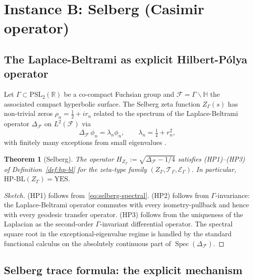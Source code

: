 \documentclass[11pt]{article}
\newtheorem{theorem}{Theorem}[section]
\theoremstyle{definition}
\theoremstyle{remark}
\newcommand{\HBL}{\mathrm{HP\text{-}BL}}
\newcommand{\PSL}{\mathrm{PSL}}
\newcommand{\Spec}{\operatorname{Spec}}
\newcommand{\halfline}{\tfrac{1}{2}}
\begin{document}
\section{Instance B: Selberg (Casimir operator)}
\label{sec:selberg}

\subsection{The Laplace-Beltrami as explicit Hilbert-P\'olya operator}

Let $\Gamma \subset \PSL_2(\mathbb{R})$ be a co-compact Fuchsian group
and $\mathcal{F} = \Gamma\backslash\mathbb{H}$ the associated compact
hyperbolic surface. The Selberg zeta function $Z_\Gamma(s)$ has
non-trivial zeros $\rho_n = \halfline + ir_n$ related to the spectrum
of the Laplace-Beltrami operator $\Delta_\mathcal{F}$ on
$L^2(\mathcal{F})$ via
\begin{equation}
\label{eq:selberg-spectral}
  \Delta_\mathcal{F}\,\phi_n = \lambda_n\phi_n, \qquad
  \lambda_n = \tfrac{1}{4} + r_n^2,
\end{equation}
with finitely many exceptions from small eigenvalues \cite{Selberg1956}.

\begin{theorem}[Selberg]\label{thm:selberg-hp}
The operator $H_{Z_\Gamma} := \sqrt{\Delta_\mathcal{F} - 1/4}$
satisfies (HP1)--(HP3) of Definition~\ref{def:hp-bl} for the zeta-type
family $(Z_\Gamma, \mathcal{T}_\Gamma, \mathcal{E}_\Gamma)$. In
particular, $\HBL(Z_\Gamma) = \mathrm{YES}$.
\end{theorem}

\begin{proof}[Sketch]
(HP1) follows from~\eqref{eq:selberg-spectral}. (HP2) follows from
$\Gamma$-invariance: the Laplace-Beltrami operator commutes with every
isometry-pullback and hence with every geodesic transfer operator.
(HP3) follows from the uniqueness of the Laplacian as the
second-order $\Gamma$-invariant differential operator. The spectral
square root in the exceptional-eigenvalue regime is handled by the
standard functional calculus on the absolutely continuous part of
$\Spec(\Delta_\mathcal{F})$.
\end{proof}

\subsection{Selberg trace formula: the explicit mechanism}
\label{sec:selberg-trace}
\end{document}
